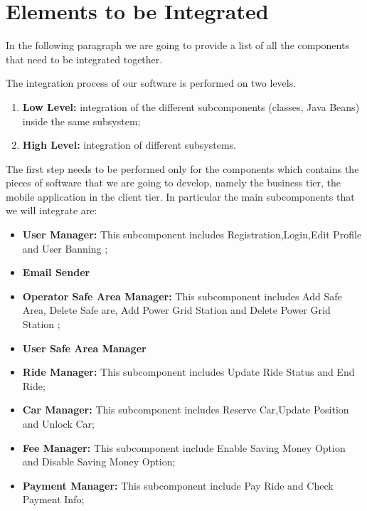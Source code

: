 \section{Elements to be Integrated}
In the following paragraph we are going to provide a list of all the components that need to be integrated together.

The integration process of our software is performed on two levels.
\begin{enumerate}
\item \textbf{Low Level:} integration of the different subcomponents (classes, Java Beans) inside the
same subsystem;
\item \textbf{High Level:} integration of different subsystems.
\end{enumerate}

The first step needs to be performed only for the components which contains
the pieces of software that we are going to develop, namely the business
tier, the mobile application in the client tier.
In particular the main subcomponents  that we will integrate are:
\begin{itemize}
\item \textbf{User Manager:} This subcomponent includes Registration,Login,Edit Profile and User Banning ;
\item \textbf{Email Sender}
\item \textbf{Operator Safe Area Manager:} This subcomponent includes Add Safe Area, Delete Safe are, Add Power Grid Station and Delete Power Grid Station ;
\item \textbf{User Safe Area Manager}
\item \textbf{Ride Manager:} This subcomponent includes Update Ride Status and End Ride;
\item \textbf{Car Manager:} This subcomponent includes Reserve Car,Update Position and Unlock Car;
\item \textbf{Fee Manager:} This subcomponent include Enable Saving Money Option and Disable Saving Money Option;
\item \textbf{Payment Manager:} This subcomponent include Pay Ride and Check Payment Info;
\end{itemize}


